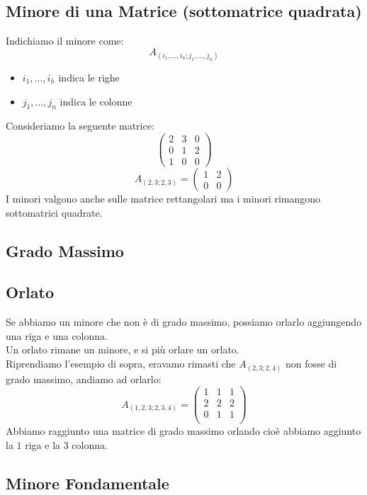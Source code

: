 \subsection{Minore di una Matrice (sottomatrice quadrata)}
Indichiamo il minore come:
$$ A_{(i_1,...,i_h; j_1,...,j_n)} $$
\begin{itemize}
\item[]$i_1,...,i_h$ indica le righe
\item[]$j_1,...,j_n$ indica le colonne
\end{itemize}
Consideriamo la seguente matrice:
$$
\begin{pmatrix}
2 & 3 & 0 \\
0 & 1 & 2 \\
1 & 0 & 0
\end{pmatrix}
$$
$$ A_{(2,3;2,3)} = \begin{pmatrix}
1 & 2\\
0 & 0
\end{pmatrix} $$
I minori valgono anche sulle matrice rettangolari ma i minori rimangono sottomatrici quadrate.\\

\subsection{Grado Massimo}


\subsection{Orlato}
Se abbiamo un minore che non è di grado massimo, possiamo orlarlo aggiungendo una riga e una colonna.\\
Un orlato rimane un minore, e si più orlare un orlato.\\
Riprendiamo l'esempio di sopra, eravamo rimasti che $A_{(2,3;2,4)}$ non fosse di grado massimo, andiamo ad orlarlo:
$$ A_{(1,2,3;2,3,4)} = \begin{pmatrix}
1 & 1 & 1 \\
2 & 2 & 2 \\
0 & 1 & 1 \\
\end{pmatrix} $$
Abbiamo raggiunto una matrice di grado massimo orlando cioè abbiamo aggiunto la $1$ riga e la $3$ colonna.\\

\subsection{Minore Fondamentale}

